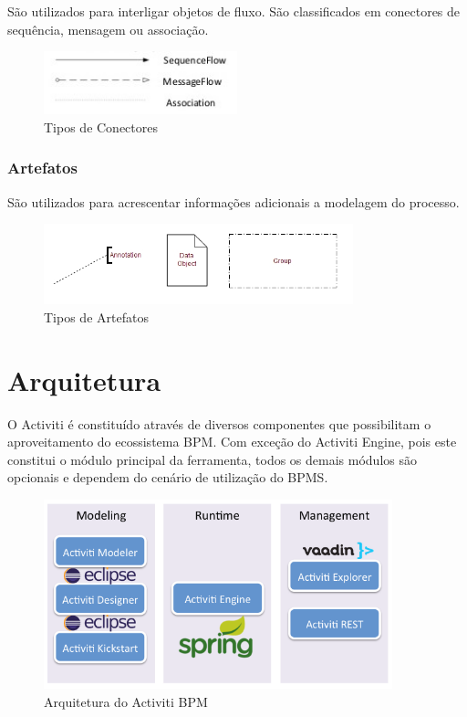     São utilizados para interligar objetos de fluxo. São classificados em conectores de sequência, mensagem ou associação.

    \begin{figure}[H]
    \centering
    \includegraphics[width=0.5\textwidth]{imagens/bpmn_connectors.jpg}
    \caption{Tipos de Conectores}
    \label{fig:bpmn_conectors}
    \end{figure}

\subsubsection{Artefatos}\label{sec:activiti-bpmn_objetos_artefatos}

    São utilizados para acrescentar informações adicionais a modelagem do processo. 

    \begin{figure}[H]
    \centering
    \includegraphics[width=0.8\textwidth]{imagens/bpmn_artifacts.jpg}
    \caption{Tipos de Artefatos}
    \label{fig:bpmn_artifacts}
    \end{figure}

\section{Arquitetura}\label{sec:activiti-gestao_processos}


O Activiti é constituído através de diversos componentes que possibilitam o aproveitamento do ecossistema BPM. Com exceção do Activiti Engine, pois este constitui o módulo principal da ferramenta, todos os demais módulos são opcionais e dependem do cenário de utilização do BPMS.

\begin{figure}[H]
\centering
\includegraphics[width=0.9\textwidth]{imagens/activiti_architecture.png}
\caption{Arquitetura do Activiti BPM}
\label{fig:activiti_architecture}
\end{figure}

